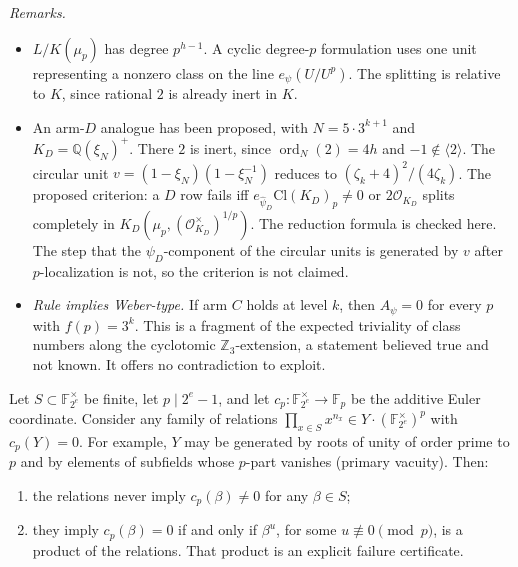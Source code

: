 \noindent\emph{Remarks.}
\begin{itemize}
\item $L/K(\mu_p)$ has degree $p^{h-1}$.  A cyclic degree-$p$ formulation
      uses one unit representing a nonzero class on the line
      $e_\psi(U/U^p)$.  The splitting is relative to $K$, since rational $2$
      is already inert in $K$.
\item An arm-$D$ analogue has been proposed, with $N=5\cdot3^{k+1}$ and
      $K_D=\mathbb Q(\xi_N)^+$.  There $2$ is inert, since
      $\operatorname{ord}_N(2)=4h$ and $-1\notin\langle2\rangle$.  The
      circular unit $v=(1-\xi_N)(1-\xi_N^{-1})$ reduces to
      $(\zeta_k+4)^2/(4\zeta_k)$.  The proposed criterion: a $D$ row fails
      iff $e_{\hat\psi_D}\mathrm{Cl}(K_D)_p\neq0$ or $2\mathcal O_{K_D}$
      splits completely in
      $K_D(\mu_p,(\mathcal O_{K_D}^{\times})^{1/p})$.  The reduction formula
      is checked here.  The step that the $\psi_D$-component of the circular
      units is generated by $v$ after $p$-localization is not, so the
      criterion is not claimed.
\item \emph{Rule implies Weber-type.}  If arm $C$ holds at level $k$, then
      $A_\psi=0$ for every $p$ with $f(p)=3^k$.  This is a fragment of the
      expected triviality of class numbers along the cyclotomic
      $\mathbb Z_3$-extension, a statement believed true and not known.  It
      offers no contradiction to exploit.
\end{itemize}

\begin{proposition}\label{prop:model-relations}
Let $S\subset\mathbb F_{2^e}^{\times}$ be finite, let $p\mid2^e-1$, and let
$c_p:\mathbb F_{2^e}^{\times}\to\mathbb F_p$ be the additive Euler coordinate.
Consider any family of relations
$\prod_{x\in S}x^{n_x}\in Y\cdot(\mathbb F_{2^e}^{\times})^p$ with
$c_p(Y)=0$.  For example, $Y$ may be generated by roots of unity of order
prime to $p$ and by elements of subfields whose $p$-part vanishes (primary
vacuity).  Then:
\begin{enumerate}
\item the relations never imply $c_p(\beta)\neq0$ for any $\beta\in S$;
\item they imply $c_p(\beta)=0$ if and only if $\beta^u$, for some
      $u\not\equiv0\pmod p$, is a product of the relations.  That product is
      an explicit failure certificate.
\end{enumerate}
\end{proposition}

